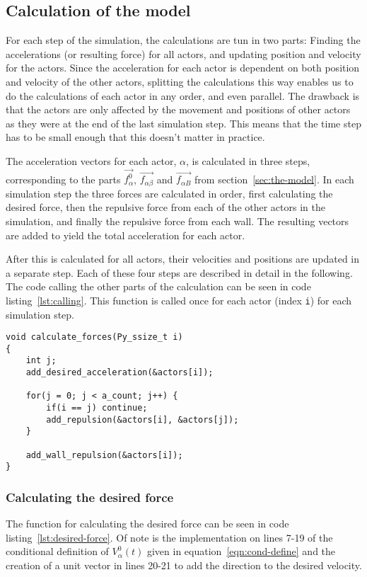 \subsection{Calculation of the model}
For each step of the simulation, the calculations are tun in two parts: 
Finding the accelerations (or resulting force) for all actors, and updating 
position and velocity for the actors.  Since the acceleration for each actor 
is dependent on both position and velocity of the other actors, splitting the 
calculations this way enables us to do the calculations of each actor in any 
order, and even parallel. The drawback is that the actors are only affected by 
the movement and positions of other actors as they were at the end of the last 
simulation step. This means that the time step has to be small enough that 
this doesn't matter in practice.

The acceleration vectors for each actor, $\alpha$, is calculated in three 
steps, corresponding to the parts $\overrightarrow{f_\alpha^0}$, 
$\overrightarrow{f_{\alpha \beta}}$ and $\overrightarrow{f_{\alpha B}}$ from 
section~\ref{sec:the-model}. In each simulation step the three forces are 
calculated in order, first calculating the desired force, then the repulsive 
force from each of the other actors in the simulation, and finally the 
repulsive force from each wall. The resulting vectors are added to yield the 
total acceleration for each actor.

After this is calculated for all actors, their velocities and positions are 
updated in a separate step. Each of these four steps are described in detail 
in the following. The code calling the other parts of the calculation can be 
seen in code listing~\ref{lst:calling}. This function is called once for each 
actor (index \texttt{i}) for each simulation step.

\begin{lstlisting}[caption={Code calling the other parts of the 
    calculation.},label=lst:calling]
void calculate_forces(Py_ssize_t i)
{
    int j;
    add_desired_acceleration(&actors[i]);

    for(j = 0; j < a_count; j++) {
        if(i == j) continue;
        add_repulsion(&actors[i], &actors[j]);
    }

    add_wall_repulsion(&actors[i]);
}
\end{lstlisting}

\subsubsection{Calculating the desired force}
The function for calculating the desired force can be seen in code 
listing~\ref{lst:desired-force}. Of note is the implementation on lines 7-19 
of the conditional definition of $V_\alpha^0(t)$ given in 
equation~\eqref{eqn:cond-define} and the creation of a unit vector in lines 
20-21 to add the direction to the desired velocity.

